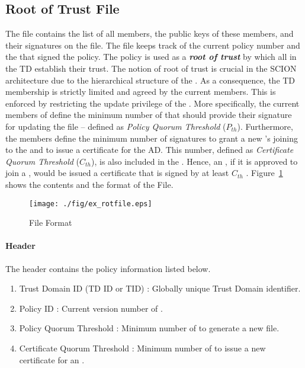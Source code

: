\subsection{Root of Trust File} \label{subsec:root-of-trust}
The \RT file contains the list of all \TDCore members, the public keys of these members, and their signatures on the \RT file. The \RT file keeps track of the current policy number and the \ADs that signed the policy. The policy is used as a {\bf \em root of trust} by which all \ADs in the TD establish their trust. The notion of root of trust is crucial in the SCION architecture due to the hierarchical structure of the \TD. As a consequence, the TD membership is strictly limited and agreed by the current members. This is enforced by restricting the update privilege of the \PF. More specifically, the current members of \TDC define the minimum number of \ADs that should provide their signature for updating the \RT file -- defined as {\em Policy Quorum Threshold} ($P_{th}$). Furthermore, the \TDC members define the minimum number of \AD signatures to grant a new \AD's joining to the \TDC and to issue a certificate for the AD. This number, defined as {\em Certificate Quorum Threshold} ($C_{th}$), is also included in the \PF. Hence, an \AD, if it is approved to join a \TDC, would be issued a certificate that is signed by at least $C_{th}$ \TDC \ADs. Figure~\ref{fig:rot-file} shows the contents and the format of the \RT File. 

\begin{figure}[h]
\centering
\texttt{[image: ./fig/ex\_rotfile.eps]}
\caption{\RT File Format}\label{fig:rot-file}
\end{figure}

\paragraph{Header}
The header contains the \TDC policy information listed below. 

\begin{enumerate}
\item Trust Domain ID (TD ID or TID) : Globally unique Trust Domain identifier.
\item Policy ID : Current version number of \PF.
\item Policy Quorum Threshold : Minimum number of \TDC \ADs to generate a new \RT file. 
\item Certificate Quorum Threshold : Minimum number of \TDC \ADs to issue a new certificate for an \AD.
\end{enumerate}

